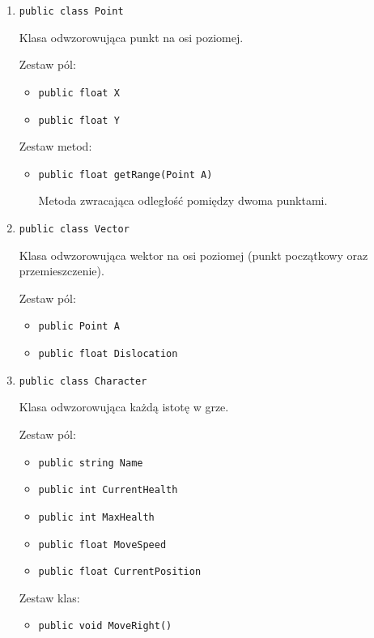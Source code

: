\documentclass[12pt, a4paper]{article}
\begin{document}
\begin{enumerate}

\item \texttt{public class Point}

Klasa odwzorowująca punkt na osi poziomej.

Zestaw pól$\colon$

\begin{itemize}
\item \texttt{public float X}
\item \texttt{public float Y}
\end{itemize}

Zestaw metod$\colon$
\begin{itemize}
\item \texttt{public float getRange(Point A)}

Metoda zwracająca odległość pomiędzy dwoma punktami.
\end{itemize}

\item \texttt{public class Vector}

Klasa odwzorowująca wektor na osi poziomej (punkt początkowy oraz 
przemieszczenie).

Zestaw pól$\colon$

\begin{itemize}
\item \texttt{public Point A}
\item \texttt{public float Dislocation}
\end{itemize}

\item \texttt{public class Character}

Klasa odwzorowująca każdą istotę w grze.

Zestaw pól$\colon$

\begin{itemize}
\item \texttt{public string Name}
\item \texttt{public int CurrentHealth}
\item \texttt{public int MaxHealth}
\item \texttt{public float MoveSpeed}
\item \texttt{public float CurrentPosition}
\end{itemize}

Zestaw klas$\colon$

\begin{itemize}
\item \texttt{public void MoveRight()}


\end{itemize}
\end{enumerate}
\end{document}
